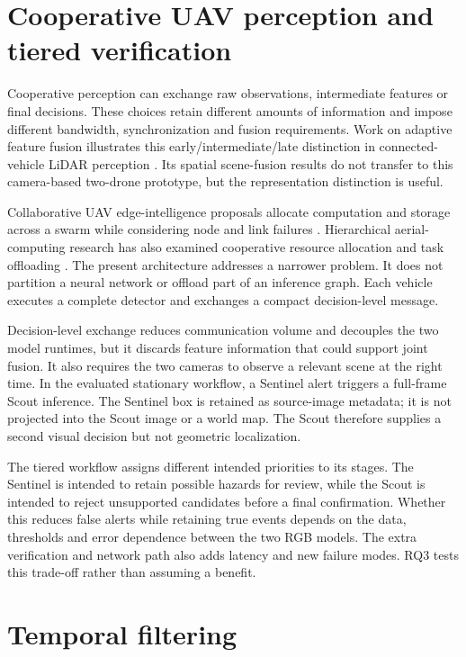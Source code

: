 \section{Cooperative UAV perception and tiered verification}
\label{sec:background:cooperation}

Cooperative perception can exchange raw observations, intermediate features or
final decisions. These choices retain different amounts of information and
impose different bandwidth, synchronization and fusion requirements. Work on
adaptive feature fusion illustrates this early/intermediate/late distinction
in connected-vehicle LiDAR perception \cite{Qiao2023AdaptiveFusion}. Its
spatial scene-fusion results do not transfer to this camera-based two-drone
prototype, but the representation distinction is useful.

Collaborative UAV edge-intelligence proposals allocate computation and storage
across a swarm while considering node and link failures
\cite{Qu2024ElasticUAV}. Hierarchical aerial-computing research has also
examined cooperative resource allocation and task offloading
\cite{Kang2023HierarchicalAerial}. The present architecture addresses a
narrower problem. It does not partition a neural network or offload part of an
inference graph. Each vehicle executes a complete detector and exchanges a
compact decision-level message.

Decision-level exchange reduces communication volume and decouples the two
model runtimes, but it discards feature information that could support joint
fusion. It also requires the two cameras to observe a relevant scene at the
right time. In the evaluated stationary workflow, a Sentinel alert triggers a
full-frame Scout inference. The Sentinel box is retained as source-image
metadata; it is not projected into the Scout image or a world map. The Scout
therefore supplies a second visual decision but not geometric localization.

The tiered workflow assigns different intended priorities to its stages. The
Sentinel is intended to retain possible hazards for review, while the Scout is
intended to reject unsupported candidates before a final confirmation. Whether
this reduces false alerts while retaining true events depends on the data,
thresholds and error dependence between the two RGB models. The extra
verification and network path also adds latency and new failure modes. RQ3
tests this trade-off rather than assuming a benefit.

\section{Temporal filtering}
\label{sec:background:temporal}

